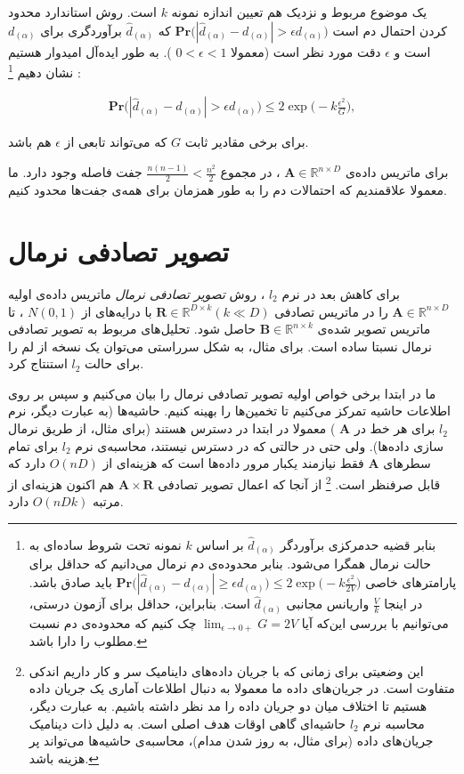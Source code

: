 یک موضوع مربوط و نزدیک هم تعیین اندازه نمونه
$k$
است. روش استاندارد محدود کردن احتمال دم است 
$\mathbf{Pr} \big( | \hat{d}_{(\alpha)} - d_{(\alpha)} | > \epsilon d_{(\alpha)} \big)$
که 
$\hat{d}_{(\alpha)}$
برآوردگری برای
$d_{(\alpha)}$
است و 
$\epsilon$
دقت مورد نظر است (معمولا 
$0<\epsilon<1$
). به طور ایده‌آل امیدوار هستیم نشان دهیم
\footnote{
بنابر قضیه حدمرکزی برآوردگر 
$\hat{d}_{(\alpha)}$
بر اساس
$k$
نمونه تحت شروط ساده‌ای به حالت نرمال همگرا می‌شود. بنابر محدوده‌ی دم نرمال می‌دانیم که حداقل برای پارامترهای خاصی 
$\mathbf{Pr} \big( | \hat{d}_{(\alpha)} - d_{(\alpha)} | \geq \epsilon d_{(\alpha)} \big) \leq 2 \exp \Big( -k \frac{\epsilon^2}{2V} \Big)$
باید صادق باشد. در اینجا 
$\frac{V}{k}$
واریانس مجانبی 
$\hat{d}_{(\alpha)}$
است. بنابراین، حداقل برای آزمون درستی، می‌توانیم با بررسی این‌که آیا
$\lim_{\epsilon \rightarrow 0+} G = 2V$
چک کنیم که محدوده‌ی دم نسبت مطلوب را دارا باشد.
}
:

\begin{align}
\mathbf{Pr} \big( | \hat{d}_{(\alpha)} - d_{(\alpha)}| > \epsilon d_{(\alpha)} \big) \leq 2 \exp \bigg( -k \frac{\epsilon^2}{G} \bigg),
\label{eq:1hr}
\end{align}

برای برخی مقادیر ثابت 
$G$
که می‌تواند تابعی از 
$\epsilon$
هم باشد.

برای ماتریس داده‌ی
$\mathbf{A} \in \mathbb{R}^{n \times D}$
، در مجموع 
$\frac{n(n-1)}{2} < \frac{n^2}{2}$
جفت فاصله وجود دارد. ما معمولا علاقمندیم که احتمالات دم را به طور همزمان برای همه‌ی جفت‌ها محدود کنیم. 

\section{
تصویر تصادفی نرمال
\label{SecNormal}
}
برای کاهش بعد در نرم 
$l_2$
، روش 
\textit{
تصویر تصادفی نرمال
}
ماتریس داده‌ی اولیه 
$\mathbf{A} \in \mathbb{R}^{n \times D}$
را در ماتریس تصادفی 
$\mathbf{R} \in \mathbb{R}^{D \times k} (k \ll D)$
با درایه‌های 
از 
$N(0,1)$
، تا ماتریس تصویر شده‌ی 
$\mathbf{B} \in \mathbb{R}^{n \times k}$
حاصل شود. تحلیل‌های مربوط به تصویر تصادفی نرمال نسبتا ساده است. برای مثال، به شکل سرراستی می‌توان یک نسخه از لم 
%
\cite{litez103}
را برای حالت 
$l_2$
استنتاج کرد.

ما در ابتدا برخی خواص اولیه تصویر تصادفی نرمال را بیان می‌کنیم و سپس بر روی اطلاعات حاشیه تمرکز می‌کنیم تا تخمین‌ها را بهینه کنیم. حاشیه‌ها (به عبارت دیگر، نرم 
$l_2$
برای هر خط در 
$\mathbf{A}$
)
معمولا در ابتدا در دسترس هستند (برای مثال، از طریق نرمال سازی داده‌ها). ولی حتی در حالتی که در دسترس نیستند، محاسبه‌ی نرم 
$l_2$
برای تمام سطرهای 
$\mathbf{A}$
فقط نیازمند یکبار مرور داده‌ها است که هزینه‌ای از 
$O(nD)$
دارد که قابل صرفنظر است.
\footnote{
این وضعیتی برای زمانی که با جریان داده‌های داینامیک سر و کار داریم اندکی متفاوت است. در جریان‌های داده ما معمولا به دنبال اطلاعات آماری یک جریان داده هستیم تا اختلاف میان دو جریان داده را مد نظر داشته باشیم. به عبارت دیگر، محاسبه نرم 
$l_2$
حاشیه‌ای گاهی اوقات هدف اصلی است. به دلیل ذات دینامیک جریان‌های داده (برای مثال، به روز شدن مدام)، محاسبه‌ی حاشیه‌ها می‌تواند پر هزینه باشد.
}
از آنجا که اعمال تصویر تصادفی 
$\mathbf{A} \times \mathbf{R}$
هم اکنون هزینه‌ای از مرتبه 
$O(nDk)$
دارد.

